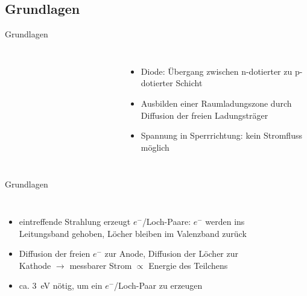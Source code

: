 \subsection[]{Grundlagen}

\begin{frame}{Grundlagen}
    \begin{columns}[T]
	    	\vspace{-0.5cm}
			\begin{figure}[htbp]
			  \centering
			  
			\end{figure}
			\vspace{-1.2cm}
			\begin{figure}[htbp]
			  \centering
			   
			   \vspace{-0.5cm}
			\end{figure}
			
	    	\begin{itemize}
	    	  \item Diode: Übergang zwischen n-dotierter zu p-dotierter Schicht
			  \item Ausbilden einer Raumladungszone durch Diffusion der freien Ladungsträger
			  \item Spannung in Sperrrichtung: kein Stromfluss möglich
			\end{itemize}
    \end{columns}
\end{frame}

\begin{frame}{Grundlagen}
    \begin{columns}[T]	
	    	\begin{itemize}
	    	  \item eintreffende Strahlung erzeugt $e^-$/Loch-Paare: $e^-$ werden ins Leitungsband
	    	  gehoben, Löcher bleiben im Valenzband zurück
	    	  \item Diffusion der freien $e^-$ zur Anode, Diffusion der Löcher zur Kathode $\rightarrow$
	    	  messbarer Strom $\propto$ Energie des Teilchens
	    	  \item ca. 3~eV nötig, um ein $e^-$/Loch-Paar zu erzeugen
			\end{itemize}
			
			\begin{figure}[htbp]
			  \centering
			   
			\end{figure}
    \end{columns}
\end{frame}